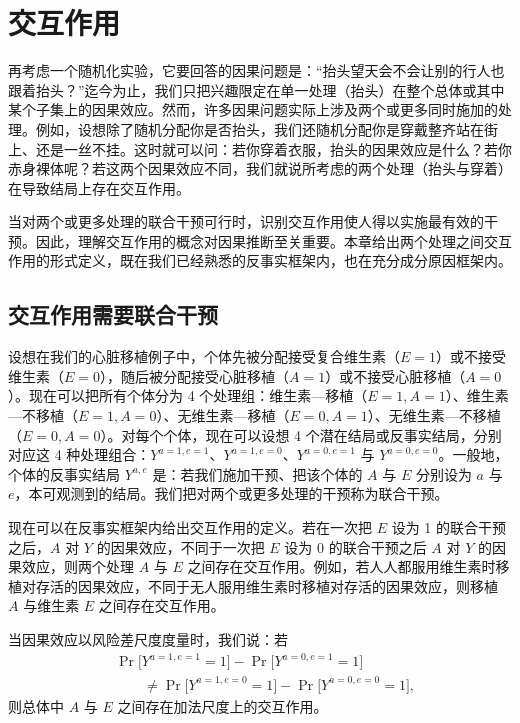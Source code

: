 \chapter{交互作用}

再考虑一个随机化实验，它要回答的因果问题是：“抬头望天会不会让别的行人也跟着抬头？”迄今为止，我们只把兴趣限定在单一处理（抬头）在整个总体或其中某个子集上的因果效应。然而，许多因果问题实际上涉及两个或更多同时施加的处理。例如，设想除了随机分配你是否抬头，我们还随机分配你是穿戴整齐站在街上、还是一丝不挂。这时就可以问：若你穿着衣服，抬头的因果效应是什么？若你赤身裸体呢？若这两个因果效应不同，我们就说所考虑的两个处理（抬头与穿着）在导致结局上存在交互作用。

当对两个或更多处理的联合干预可行时，识别交互作用使人得以实施最有效的干预。因此，理解交互作用的概念对因果推断至关重要。本章给出两个处理之间交互作用的形式定义，既在我们已经熟悉的反事实框架内，也在充分成分原因框架内。

\section{交互作用需要联合干预}

设想在我们的心脏移植例子中，个体先被分配接受复合维生素（$E=1$）或不接受维生素（$E=0$），随后被分配接受心脏移植（$A=1$）或不接受心脏移植（$A=0$）。现在可以把所有个体分为 4 个处理组：维生素—移植（$E=1,A=1$）、维生素—不移植（$E=1,A=0$）、无维生素—移植（$E=0,A=1$）、无维生素—不移植（$E=0,A=0$）。对每个个体，现在可以设想 4 个潜在结局或反事实结局，分别对应这 4 种处理组合：$Y^{a=1,e=1}$、$Y^{a=1,e=0}$、$Y^{a=0,e=1}$ 与 $Y^{a=0,e=0}$。一般地，个体的反事实结局 $Y^{a,e}$ 是：若我们施加干预、把该个体的 $A$ 与 $E$ 分别设为 $a$ 与 $e$，本可观测到的结局。我们把对两个或更多处理的干预称为联合干预。


现在可以在反事实框架内给出交互作用的定义。若在一次把 $E$ 设为 1 的联合干预之后，$A$ 对 $Y$ 的因果效应，不同于一次把 $E$ 设为 0 的联合干预之后 $A$ 对 $Y$ 的因果效应，则两个处理 $A$ 与 $E$ 之间存在交互作用。例如，若人人都服用维生素时移植对存活的因果效应，不同于无人服用维生素时移植对存活的因果效应，则移植 $A$ 与维生素 $E$ 之间存在交互作用。

当因果效应以风险差尺度度量时，我们说：若
\[
\begin{aligned}
&\Pr\bigl[Y^{a=1,e=1}=1\bigr]-\Pr\bigl[Y^{a=0,e=1}=1\bigr]\\
&\qquad\neq \Pr\bigl[Y^{a=1,e=0}=1\bigr]-\Pr\bigl[Y^{a=0,e=0}=1\bigr],
\end{aligned}
\]
则总体中 $A$ 与 $E$ 之间存在加法尺度上的交互作用。

